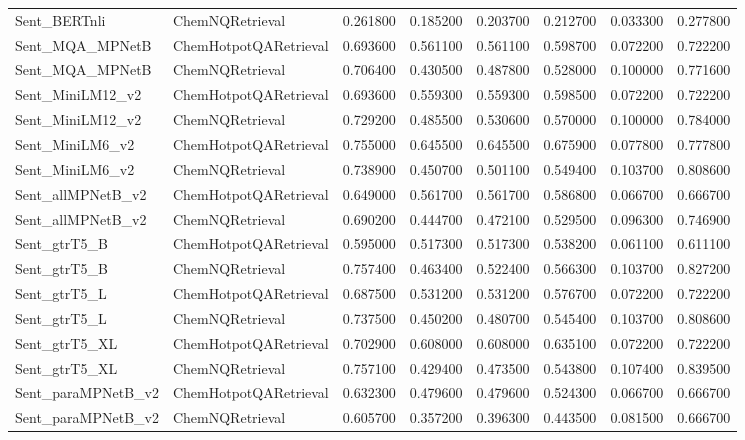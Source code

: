 {\begin{longtable}{llrrrrrr}
Sent\_BERTnli & ChemNQRetrieval & 0.261800 & 0.185200 & 0.203700 & 0.212700 & 0.033300 & 0.277800 \\
Sent\_MQA\_MPNetB & ChemHotpotQARetrieval & 0.693600 & 0.561100 & 0.561100 & 0.598700 & 0.072200 & 0.722200 \\
Sent\_MQA\_MPNetB & ChemNQRetrieval & 0.706400 & 0.430500 & 0.487800 & 0.528000 & 0.100000 & 0.771600 \\
Sent\_MiniLM12\_v2 & ChemHotpotQARetrieval & 0.693600 & 0.559300 & 0.559300 & 0.598500 & 0.072200 & 0.722200 \\
Sent\_MiniLM12\_v2 & ChemNQRetrieval & 0.729200 & 0.485500 & 0.530600 & 0.570000 & 0.100000 & 0.784000 \\
Sent\_MiniLM6\_v2 & ChemHotpotQARetrieval & 0.755000 & 0.645500 & 0.645500 & 0.675900 & 0.077800 & 0.777800 \\
Sent\_MiniLM6\_v2 & ChemNQRetrieval & 0.738900 & 0.450700 & 0.501100 & 0.549400 & 0.103700 & 0.808600 \\
Sent\_allMPNetB\_v2 & ChemHotpotQARetrieval & 0.649000 & 0.561700 & 0.561700 & 0.586800 & 0.066700 & 0.666700 \\
Sent\_allMPNetB\_v2 & ChemNQRetrieval & 0.690200 & 0.444700 & 0.472100 & 0.529500 & 0.096300 & 0.746900 \\
Sent\_gtrT5\_B & ChemHotpotQARetrieval & 0.595000 & 0.517300 & 0.517300 & 0.538200 & 0.061100 & 0.611100 \\
Sent\_gtrT5\_B & ChemNQRetrieval & 0.757400 & 0.463400 & 0.522400 & 0.566300 & 0.103700 & 0.827200 \\
Sent\_gtrT5\_L & ChemHotpotQARetrieval & 0.687500 & 0.531200 & 0.531200 & 0.576700 & 0.072200 & 0.722200 \\
Sent\_gtrT5\_L & ChemNQRetrieval & 0.737500 & 0.450200 & 0.480700 & 0.545400 & 0.103700 & 0.808600 \\
Sent\_gtrT5\_XL & ChemHotpotQARetrieval & 0.702900 & 0.608000 & 0.608000 & 0.635100 & 0.072200 & 0.722200 \\
Sent\_gtrT5\_XL & ChemNQRetrieval & 0.757100 & 0.429400 & 0.473500 & 0.543800 & 0.107400 & 0.839500 \\
Sent\_paraMPNetB\_v2 & ChemHotpotQARetrieval & 0.632300 & 0.479600 & 0.479600 & 0.524300 & 0.066700 & 0.666700 \\
Sent\_paraMPNetB\_v2 & ChemNQRetrieval & 0.605700 & 0.357200 & 0.396300 & 0.443500 & 0.081500 & 0.666700 \\
\end{longtable}

}